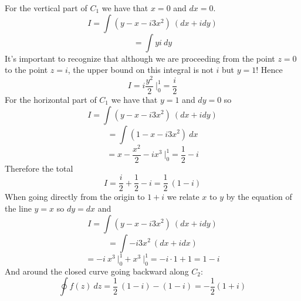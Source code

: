 \documentclass[11pt, oneside]{article}
\begin{document}
For the vertical part of $C_1$ we have that $x = 0$ and $dx = 0$.
\[ I = \int ( y - x - i3x^2 )\ (dx + idy) \]
\[ = \int y i \ dy \]
It's important to recognize that although we are proceeding from the point $z=0$ to the point $z = i$, the upper bound on this integral is not $i$ but $y = 1$!  Hence
\[ I = i\frac{y^2}{2} \ \bigg |_0^1 = \frac{i}{2} \]
For the horizontal part of $C_1$ we have that $y=1$ and $dy = 0$ so
\[ I = \int ( y - x - i3x^2 )\ (dx + idy) \]
\[ = \int (1 - x - i3x^2) \ dx \]
\[ = x - \frac{x^2}{2} - ix^3 \ \bigg |_0^1 = \frac{1}{2} - i \]
Therefore the total
\[ I = \frac{i}{2} + \frac{1}{2} - i = \frac{1}{2} \ (1 - i) \]
When going directly from the origin to $1 + i$ we relate $x$ to $y$ by the equation of the line $y=x$ so $dy = dx$ and
\[ I = \int ( y - x - i3x^2 )\ (dx + idy) \]
\[ = \int - i3x^2 \ (dx + i dx) \]
\[ = -i  \ x^3 \ \bigg |_0^1 + x^3 \ \bigg |_0^1 = -i \cdot 1 + 1 = 1  - i \]
And around the closed curve going backward along $C_2$:
\[ \oint f(z) \ dz =  \frac{1}{2} \ (1 - i) - (1  - i ) = -\frac{1}{2} (1 + i) \]
\end{document}
